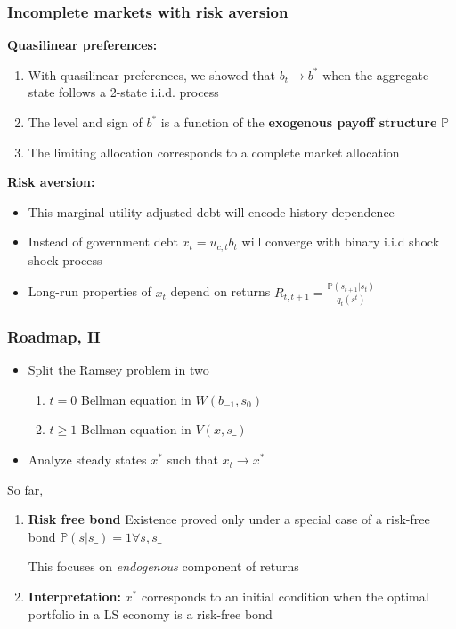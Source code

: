 \documentclass{beamer}
\begin{document}
\begin{frame}
 \frametitle{Incomplete markets with risk aversion}
 \textbf{Quasilinear preferences: }
 \begin{enumerate}
  \item With quasilinear preferences, we showed that $b_t\to b^*$ when the aggregate state follows a 2-state i.i.d. process
  \item The level  and sign of $b^*$ is a function of the \textbf{exogenous payoff structure} $\mathbb{P}$
  \item The limiting allocation corresponds to a complete market allocation
 \end{enumerate}

 \textbf{Risk aversion:}
  \begin{itemize}
   \item This marginal utility adjusted debt will encode history dependence
   \item Instead of government debt  $x_t=u_{c,t}b_{t}$ will converge with binary i.i.d shock shock process

   \item Long-run properties of $x_t$ depend on returns $R_{t,t+1}=\frac{\mathbb{P}(s_{t+1}|s_t)}{q_t(s^t)}$

  \end{itemize}
  \end{frame}
%
\begin{frame}
\frametitle{Roadmap, II}
\begin{itemize}

\item Split the Ramsey problem in two
\begin{enumerate}
 \item  $t=0$ Bellman equation in $W(b_{-1},s_0)$ %
 \item  $t\geq 1$ Bellman equation in $V(x,s\_)$
\end{enumerate}

\item Analyze steady states $x^*$ such that $x_t \to x^*$

\end{itemize}
So far,
\begin{enumerate}
 \item \textbf{Risk free bond} Existence proved only under a special case of a risk-free bond  $\mathbb{P}(s|s\_)=1 \forall s,s\_$ 
 
 This focuses on \textit{endogenous} component of returns

 \item \textbf{Interpretation:}  $x^*$  corresponds to an initial condition when the optimal portfolio in a LS economy is a risk-free bond

\end{enumerate}

\end{frame}
\end{document}
